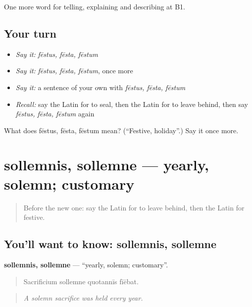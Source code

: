 \begin{grammarlens}[title={What you've built}]
One more word for telling, explaining and describing at B1.
\end{grammarlens}

\subsection*{Your turn}
\begin{itemize}
\raggedright
  \item \emph{Say it:} \emph{fēstus, fēsta, fēstum}
  \item \emph{Say it:} \emph{fēstus, fēsta, fēstum}, once more
  \item \emph{Say it:} a sentence of your own with \emph{fēstus, fēsta, fēstum}
  \item \emph{Recall:} say the Latin for to seal, then the Latin for to leave behind, then say \emph{fēstus, fēsta, fēstum} again
\end{itemize}

\begin{tcolorbox}[breakable,colback=teal!4,colframe=teal!35!black,title={Before you move on}]
What does fēstus, fēsta, fēstum mean? (\textquotedblleft{}Festive, holiday\textquotedblright{}.) Say it once more.
\end{tcolorbox}
\section[sollemnis, sollemne]{sollemnis, sollemne — yearly, solemn; customary}

\label{lesson:LA-C333-sollemnis}



\begin{quote}
Before the new one: say the Latin for to leave behind, then the Latin for festive.
\end{quote}

\subsection*{You'll want to know: sollemnis, sollemne}
\textbf{sollemnis, sollemne} — \textquotedblleft{}yearly, solemn; customary\textquotedblright{}.

\begin{quote}
Sacrificium sollemne quotannīs fīēbat.
\end{quote}

\begin{quote}
\emph{A solemn sacrifice was held every year.}
\end{quote}

